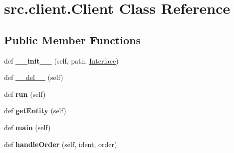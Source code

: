 \hypertarget{classsrc_1_1client_1_1_client}{}\section{src.\+client.\+Client Class Reference}
\label{classsrc_1_1client_1_1_client}
\subsection*{Public Member Functions}
\begin{DoxyCompactItemize}
\item 
\hypertarget{classsrc_1_1client_1_1_client_a96626700b63381eaa650b0263083d59a}{}\label{classsrc_1_1client_1_1_client_a96626700b63381eaa650b0263083d59a} 
def {\bfseries \+\_\+\+\_\+init\+\_\+\+\_\+} (self, path, \hyperlink{classsrc_1_1print_world_1_1_interface}{Interface})
\item 
def \hyperlink{classsrc_1_1client_1_1_client_ad06816480ed00d1c26c21be499a9d0ec}{\+\_\+\+\_\+del\+\_\+\+\_\+} (self)
\item 
\hypertarget{classsrc_1_1client_1_1_client_a386db80c624cf4f4675945dba8059274}{}\label{classsrc_1_1client_1_1_client_a386db80c624cf4f4675945dba8059274} 
def {\bfseries run} (self)
\item 
\hypertarget{classsrc_1_1client_1_1_client_a8340040e27f7ef49f7113f06197a5d42}{}\label{classsrc_1_1client_1_1_client_a8340040e27f7ef49f7113f06197a5d42} 
def {\bfseries get\+Entity} (self)
\item 
\hypertarget{classsrc_1_1client_1_1_client_a90965cbcc321da08d3f82a0eacdc7681}{}\label{classsrc_1_1client_1_1_client_a90965cbcc321da08d3f82a0eacdc7681} 
def {\bfseries main} (self)
\item 
\hypertarget{classsrc_1_1client_1_1_client_a29a065275e25e5ef4d9d54bba40117d6}{}\label{classsrc_1_1client_1_1_client_a29a065275e25e5ef4d9d54bba40117d6} 
def {\bfseries handle\+Order} (self, ident, order)
\end{DoxyCompactItemize}
